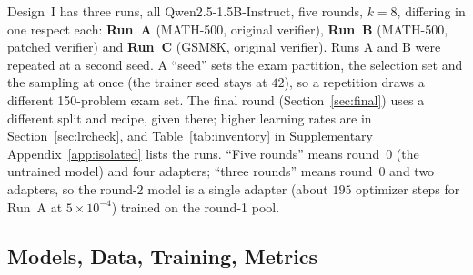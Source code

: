 \documentclass[runningheads]{llncs}
\begin{document}
Design~I has three runs, all Qwen2.5-1.5B-Instruct, five rounds, $k=8$, differing
in one respect each: \textbf{Run~A} (MATH-500, original verifier), \textbf{Run~B}
(MATH-500, patched verifier) and \textbf{Run~C} (GSM8K, original verifier). Runs
A and B were repeated at a second seed. A
``seed'' sets the exam partition, the selection set and the sampling at once (the trainer seed stays at $42$), so a repetition draws a different 150-problem exam set. The final round
(Section~\ref{sec:final}) uses a different split and recipe, given there; higher
learning rates are in Section~\ref{sec:lrcheck}, and Table~\ref{tab:inventory}
in Supplementary Appendix~\ref{app:isolated} lists the runs. ``Five rounds'' means
round~0 (the untrained model) and four adapters; ``three rounds'' means round~0 and two adapters, so the
round-2 model is a single adapter (about $195$ optimizer steps for Run~A at
$5\times10^{-4}$) trained on the round-1 pool.

\subsection{Models, Data, Training, Metrics}
\label{sec:config}
\end{document}
